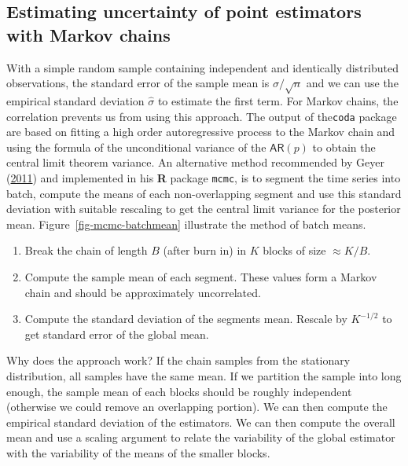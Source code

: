 \documentclass[
  11pt,
  letterpaper,
]{scrbook}
\providecommand{\tightlist}{%
  \setlength{\itemsep}{0pt}\setlength{\parskip}{0pt}}\usepackage{longtable,booktabs,array}
\theoremstyle{definition}
\theoremstyle{definition}
\theoremstyle{definition}
\theoremstyle{plain}
\theoremstyle{remark}
\begin{document}
\hypertarget{estimating-uncertainty-of-point-estimators-with-markov-chains}{%
\subsection{Estimating uncertainty of point estimators with Markov
chains}\label{estimating-uncertainty-of-point-estimators-with-markov-chains}}

With a simple random sample containing independent and identically
distributed observations, the standard error of the sample mean is
\(\sigma/\sqrt{n}\) and we can use the empirical standard deviation
\(\widehat{\sigma}\) to estimate the first term. For Markov chains, the
correlation prevents us from using this approach. The output of
the\texttt{coda} package are based on fitting a high order
autoregressive process to the Markov chain and using the formula of the
unconditional variance of the \(\mathsf{AR}(p)\) to obtain the central
limit theorem variance. An alternative method recommended by Geyer
(\protect\hyperlink{ref-Geyer:2011}{2011}) and implemented in his
\textbf{R} package \texttt{mcmc}, is to segment the time series into
batch, compute the means of each non-overlapping segment and use this
standard deviation with suitable rescaling to get the central limit
variance for the posterior mean. Figure~\ref{fig-mcmc-batchmean}
illustrate the method of batch means.

\begin{enumerate}
\def\labelenumi{\arabic{enumi}.}
\tightlist
\item
  Break the chain of length \(B\) (after burn in) in \(K\) blocks of
  size \(\approx K/B\).
\item
  Compute the sample mean of each segment. These values form a Markov
  chain and should be approximately uncorrelated.
\item
  Compute the standard deviation of the segments mean. Rescale by
  \(K^{-1/2}\) to get standard error of the global mean.
\end{enumerate}

Why does the approach work? If the chain samples from the stationary
distribution, all samples have the same mean. If we partition the sample
into long enough, the sample mean of each blocks should be roughly
independent (otherwise we could remove an overlapping portion). We can
then compute the empirical standard deviation of the estimators. We can
then compute the overall mean and use a scaling argument to relate the
variability of the global estimator with the variability of the means of
the smaller blocks.
\end{document}
